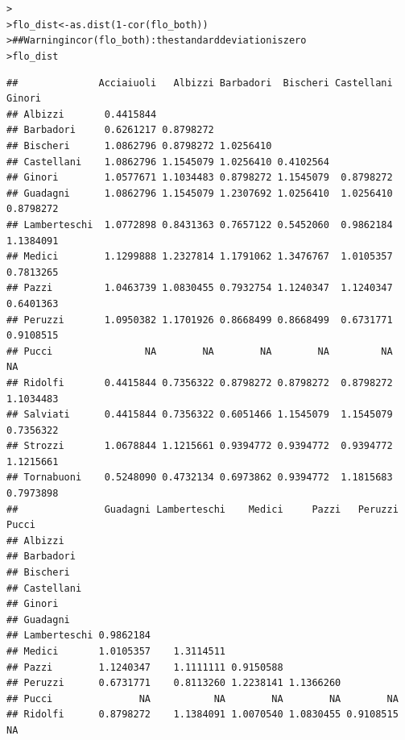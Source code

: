\documentclass[12pt]{article}\usepackage[]{graphicx}\usepackage[]{color}
\makeatletter
\newcommand{\hlnum}[1]{\textcolor[rgb]{0.82,0.78,0.62}{#1}}%
\newcommand{\hlcom}[1]{\textcolor[rgb]{0.404,0.408,0.42}{#1}}%
\newcommand{\hlopt}[1]{\textcolor[rgb]{0.882,0.878,0.898}{#1}}%
\newcommand{\hlstd}[1]{\textcolor[rgb]{0.882,0.878,0.898}{#1}}%
\newcommand{\hlkwb}[1]{\textcolor[rgb]{0.902,0.675,0.196}{#1}}%
\newcommand{\hlkwd}[1]{\textcolor[rgb]{0.733,0.388,0.812}{#1}}%
\newenvironment{kframe}{%
 \def\at@end@of@kframe{}%
 \ifinner\ifhmode%
  \def\at@end@of@kframe{\end{minipage}}%
  \begin{minipage}{\columnwidth}%
 \fi\fi%
 \def\FrameCommand##1{\hskip\@totalleftmargin \hskip-\fboxsep
 \colorbox{shadecolor}{##1}\hskip-\fboxsep
     \hskip-\linewidth \hskip-\@totalleftmargin \hskip\columnwidth}%
 \MakeFramed {\advance\hsize-\width
   \@totalleftmargin\z@ \linewidth\hsize
   \@setminipage}}%
 {\par\unskip\endMakeFramed%
 \at@end@of@kframe}
\newenvironment{knitrout}{}{} %
\makeatother
\begin{document}
\begin{flushleft}
\begin{center}
\begin{knitrout}
\begin{kframe}
\begin{alltt}
\hlstd{> }
\hlstd{> }\hlstd{flo_dist} \hlkwb{<-} \hlkwd{as.dist}\hlstd{(}\hlnum{1}\hlopt{-}\hlkwd{cor}\hlstd{(flo_both))}
\hlstd{> }\hlcom{## Warning in cor(flo_both): the standard deviation is zero}
\hlstd{> }\hlstd{flo_dist}
\end{alltt}
\begin{verbatim}
##              Acciaiuoli   Albizzi Barbadori  Bischeri Castellani    Ginori
## Albizzi       0.4415844                                                   
## Barbadori     0.6261217 0.8798272                                         
## Bischeri      1.0862796 0.8798272 1.0256410                               
## Castellani    1.0862796 1.1545079 1.0256410 0.4102564                     
## Ginori        1.0577671 1.1034483 0.8798272 1.1545079  0.8798272          
## Guadagni      1.0862796 1.1545079 1.2307692 1.0256410  1.0256410 0.8798272
## Lamberteschi  1.0772898 0.8431363 0.7657122 0.5452060  0.9862184 1.1384091
## Medici        1.1299888 1.2327814 1.1791062 1.3476767  1.0105357 0.7813265
## Pazzi         1.0463739 1.0830455 0.7932754 1.1240347  1.1240347 0.6401363
## Peruzzi       1.0950382 1.1701926 0.8668499 0.8668499  0.6731771 0.9108515
## Pucci                NA        NA        NA        NA         NA        NA
## Ridolfi       0.4415844 0.7356322 0.8798272 0.8798272  0.8798272 1.1034483
## Salviati      0.4415844 0.7356322 0.6051466 1.1545079  1.1545079 0.7356322
## Strozzi       1.0678844 1.1215661 0.9394772 0.9394772  0.9394772 1.1215661
## Tornabuoni    0.5248090 0.4732134 0.6973862 0.9394772  1.1815683 0.7973898
##               Guadagni Lamberteschi    Medici     Pazzi   Peruzzi     Pucci
## Albizzi                                                                    
## Barbadori                                                                  
## Bischeri                                                                   
## Castellani                                                                 
## Ginori                                                                     
## Guadagni                                                                   
## Lamberteschi 0.9862184                                                     
## Medici       1.0105357    1.3114511                                        
## Pazzi        1.1240347    1.1111111 0.9150588                              
## Peruzzi      0.6731771    0.8113260 1.2238141 1.1366260                    
## Pucci               NA           NA        NA        NA        NA          
## Ridolfi      0.8798272    1.1384091 1.0070540 1.0830455 0.9108515        NA

\end{verbatim}
\end{kframe}
\end{knitrout}
\end{center}
\end{flushleft}
\end{document}
